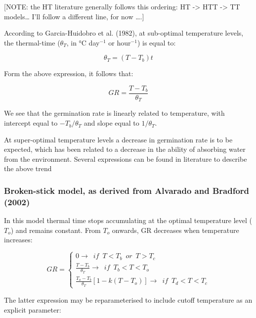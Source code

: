\documentclass[a4paper,12pt]{article}
\begin{document}
{[}NOTE: the HT literature generally follows this ordering: HT
-\textgreater{} HTT -\textgreater{} TT models\ldots{} I'll follow a
different line, for now \ldots{}.{]}

According to Garcia-Huidobro et al. (1982), at sub-optimal temperature
levels, the thermal-time (\(\theta_T\), in °C day\(^{-1}\) or
hour\(^{-1}\)) is equal to:

\begin{equation}
\theta_T = (T - T_b) t
\end{equation}

Form the above expression, it follows that:

\begin{equation}
GR = \frac{T - T_b}{\theta_T}
\end{equation}

We see that the germination rate is linearly related to temperature,
with intercept equal to \(-T_b/\theta_T\) and slope equal to
\(1/\theta_T\).

At super-optimal temperature levels a decrease in germination rate is to
be expected, which has been related to a decrease in the ability of
absorbing water from the environment. Several expressions can be found
in literature to describe the above trend

\subsubsection{Broken-stick model, as derived from Alvarado and Bradford
(2002)}\label{broken-stick-model-as-derived-from-alvarado2002_hydrotime}

In this model thermal time stops accumulating at the optimal temperature
level (\(T_o\)) and remains constant. From \(T_o\) onwards, GR decreases
when temperature increases:

\begin{equation}
GR = \left\{ {\begin{array}{*{20}{l}}
0 \rightarrow \,\,\, if \,\,\, T < T_b \,\,\, or \,\,\, T > T_c \\
\frac{T - T_b}{\theta_T} \rightarrow \,\,\, if \,\,\, T_b < T < T_o \\
\frac{T_o - T_b}{\theta_T} \left[ 1 - k (T - T_o) \right] \rightarrow \,\,\, if \,\,\, T_d < T < T_c 
\end{array}} \right.
\end{equation}

The latter expression may be reparameterised to include cutoff
temperature as an explicit parameter:
\end{document}

